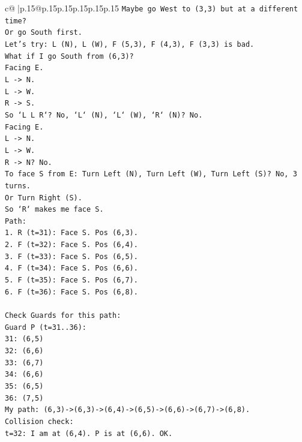 \documentclass{article}
\begin{document}
{\begin{supertabular}{c@{$\;$}|p{.15\linewidth}@{}p{.15\linewidth}p{.15\linewidth}p{.15\linewidth}p{.15\linewidth}p{.15\linewidth}}
{{{\texttt{Maybe go West to (3,3) but at a different time?} \\
\texttt{Or go South first.} \\
\texttt{Let's try: L (N), L (W), F (5,3), F (4,3), F (3,3) is bad.} \\
\texttt{What if I go South from (6,3)?} \\
\texttt{Facing E.} \\
\texttt{L {-}> N.} \\
\texttt{L {-}> W.} \\
\texttt{R {-}> S.} \\
\texttt{So `L L R`? No, `L` (N), `L` (W), `R` (N)? No.} \\
\texttt{Facing E.} \\
\texttt{L {-}> N.} \\
\texttt{L {-}> W.} \\
\texttt{R {-}> N? No.} \\
\texttt{To face S from E: Turn Left (N), Turn Left (W), Turn Left (S)? No, 3 turns.} \\
\texttt{Or Turn Right (S).} \\
\texttt{So `R` makes me face S.} \\
\texttt{Path:} \\
\texttt{1. R (t=31): Face S. Pos (6,3).} \\
\texttt{2. F (t=32): Face S. Pos (6,4).} \\
\texttt{3. F (t=33): Face S. Pos (6,5).} \\
\texttt{4. F (t=34): Face S. Pos (6,6).} \\
\texttt{5. F (t=35): Face S. Pos (6,7).} \\
\texttt{6. F (t=36): Face S. Pos (6,8).} \\
\\ 
\texttt{Check Guards for this path:} \\
\texttt{Guard P (t=31..36):} \\
\texttt{31: (6,5)} \\
\texttt{32: (6,6)} \\
\texttt{33: (6,7)} \\
\texttt{34: (6,6)} \\
\texttt{35: (6,5)} \\
\texttt{36: (7,5)} \\
\texttt{My path: (6,3){-}>(6,3){-}>(6,4){-}>(6,5){-}>(6,6){-}>(6,7){-}>(6,8).} \\
\texttt{Collision check:} \\
\texttt{t=32: I am at (6,4). P is at (6,6). OK.} \\
}}}
\end{supertabular}}
\end{document}
